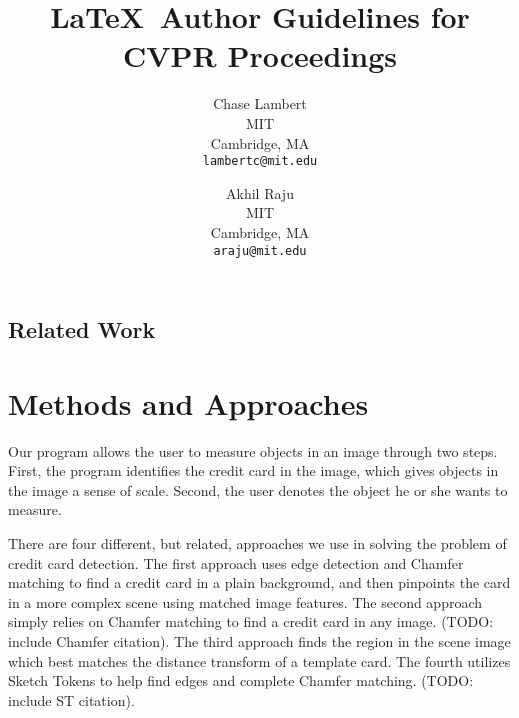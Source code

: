 \documentclass[10pt,twocolumn,letterpaper]{article}
\begin{document}
\title{\LaTeX\ Author Guidelines for CVPR Proceedings}

\author{Chase Lambert\\
MIT\\
Cambridge, MA\\
{\tt\small lambertc@mit.edu}
\and
Akhil Raju\\
MIT\\
Cambridge, MA\\
{\tt\small araju@mit.edu}
}

\maketitle


\subsection{Related Work}


\section{Methods and Approaches}
Our program allows the user to measure objects in an image through two steps. First, the program identifies the credit card in the image, which gives objects in the image a sense of scale. Second, the user denotes the object he or she wants to measure. 

There are four different, but related, approaches we use in solving the problem of credit card detection. The first approach uses edge detection and Chamfer matching to find a credit card in a plain background, and then pinpoints the card in a more complex scene using matched image features. The second approach simply relies on Chamfer matching to find a credit card in any image. (TODO: include Chamfer citation). The third approach finds the region in the scene image which best matches the distance transform of a template card. The fourth utilizes Sketch Tokens to help find edges and complete Chamfer matching. (TODO: include ST citation). 
\end{document}
